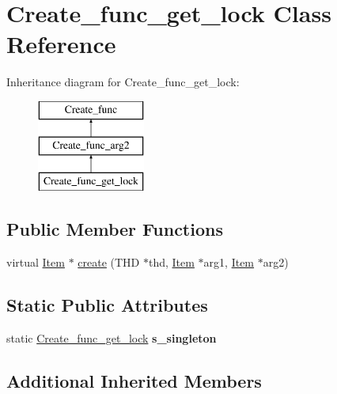 \hypertarget{classCreate__func__get__lock}{}\section{Create\+\_\+func\+\_\+get\+\_\+lock Class Reference}
\label{classCreate__func__get__lock}
Inheritance diagram for Create\+\_\+func\+\_\+get\+\_\+lock\+:\begin{figure}[H]
\begin{center}
\leavevmode
\includegraphics[height=3.000000cm]{classCreate__func__get__lock}
\end{center}
\end{figure}
\subsection*{Public Member Functions}
\begin{DoxyCompactItemize}
\item 
virtual \mbox{\hyperlink{classItem}{Item}} $\ast$ \mbox{\hyperlink{classCreate__func__get__lock_a77ec90bc648c434e539f9a0d724f6393}{create}} (T\+HD $\ast$thd, \mbox{\hyperlink{classItem}{Item}} $\ast$arg1, \mbox{\hyperlink{classItem}{Item}} $\ast$arg2)
\end{DoxyCompactItemize}
\subsection*{Static Public Attributes}
\begin{DoxyCompactItemize}
\item 
\mbox{\label{classCreate__func__get__lock_a5cb5f3d578fdd19ec0de150d7b025033}} 
static \mbox{\hyperlink{classCreate__func__get__lock}{Create\+\_\+func\+\_\+get\+\_\+lock}} {\bfseries s\+\_\+singleton}
\end{DoxyCompactItemize}
\subsection*{Additional Inherited Members}


